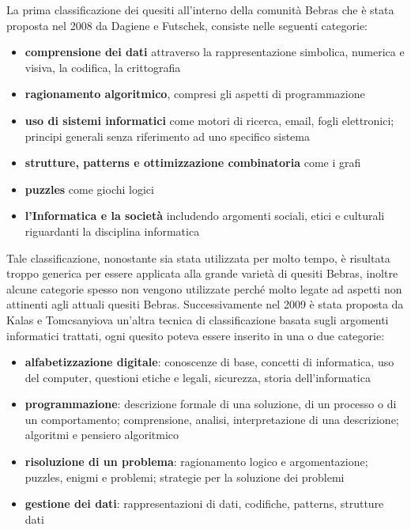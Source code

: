\documentclass[12pt]{report}
\begin{document}
La prima classificazione dei quesiti all'interno della comunità Bebras che è stata proposta nel 2008 da Dagiene e Futschek\cite{DagieneISEEP2008}, consiste nelle seguenti categorie:
\begin{itemize}
\item \textbf{comprensione dei dati}
attraverso la rappresentazione simbolica, numerica e visiva, la codifica, la crittografia

\item \textbf{ragionamento algoritmico},
compresi gli aspetti di programmazione

\item \textbf{uso di sistemi informatici}
come motori di ricerca, email, fogli elettronici; principi generali senza riferimento ad uno specifico sistema

\item \textbf{strutture, patterns e ottimizzazione combinatoria}
come i grafi

\item \textbf{puzzles}
come giochi logici

\item \textbf{l'Informatica e la società}
includendo argomenti sociali, etici e culturali riguardanti la disciplina informatica
\end{itemize}

Tale classificazione, nonostante sia stata utilizzata per molto tempo, è risultata troppo generica per essere applicata alla grande varietà di quesiti Bebras, inoltre alcune categorie spesso non vengono utilizzate perché molto legate ad aspetti non attinenti agli attuali quesiti Bebras.
Successivamente nel 2009 è stata proposta da Kalas e Tomcsanyiova\cite{KalasIFIP2009} un'altra tecnica di classificazione basata sugli argomenti informatici trattati, ogni quesito poteva essere inserito in una o due categorie:
\begin{itemize}
	\item \textbf{alfabetizzazione digitale}: conoscenze di base, concetti di informatica, uso del computer, questioni etiche e legali, sicurezza, storia dell'informatica
	\item \textbf{programmazione}: descrizione formale di una soluzione, di un processo o di un comportamento; comprensione, analisi, interpretazione di una descrizione; algoritmi e pensiero algoritmico
	\item \textbf{risoluzione di un problema}: ragionamento logico e argomentazione; puzzles, enigmi e problemi; strategie per la soluzione dei problemi
	\item \textbf{gestione dei dati}: rappresentazioni di dati, codifiche, patterns, strutture dati
\end{itemize}
\end{document}
